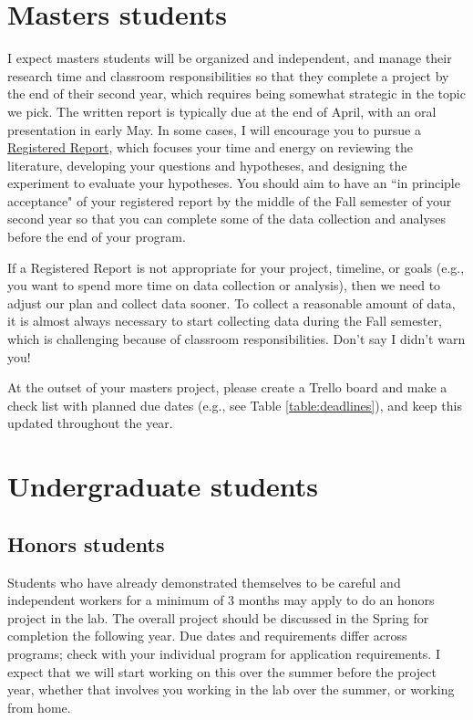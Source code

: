 \documentclass[letterpaper,12pt,oneside]{memoir}
\begin{document}
\section{Masters students}
I expect masters students will be organized and independent, and manage their research time and classroom responsibilities so that they complete a project by the end of their second year, which requires being somewhat strategic in the topic we pick. The written report is typically due at the end of April, with an oral presentation in early May. In some cases, I will encourage you to pursue a \href{https://cos.io/rr/}{Registered Report}, which focuses your time and energy on reviewing the literature, developing your questions and hypotheses, and designing the experiment to evaluate your hypotheses. You should aim to have an ``in principle acceptance" of your registered report by the middle of the Fall semester of your second year so that you can complete some of the data collection and analyses before the end of your program.

If a Registered Report is not appropriate for your project, timeline, or goals (e.g., you want to spend more time on data collection or analysis), then we need to adjust our plan and collect data sooner. To collect a reasonable amount of data, it is almost always necessary to start collecting data during the Fall semester, which is challenging because of classroom responsibilities. Don't say I didn't warn you!

At the outset of your masters project, please create a Trello board and make a check list with planned due dates (e.g., see Table \ref{table:deadlines}), and keep this updated throughout the year.

\section{Undergraduate students}

\subsection{Honors students}

Students who have already demonstrated themselves to be careful and independent workers for a minimum of 3 months may apply to do an honors project in the lab. The overall project should be discussed in the Spring for completion the following year. Due dates and requirements differ across programs; check with your individual program for application requirements. I expect that we will start working on this over the summer before the project year, whether that involves you working in the lab over the summer, or working from home.
\end{document}
